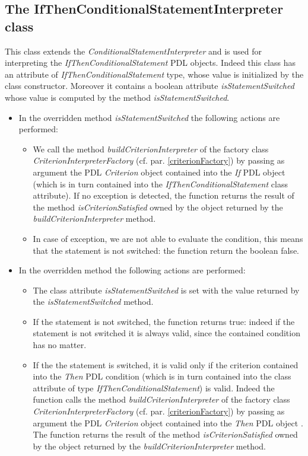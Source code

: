 \documentclass[a4paper,11pt] {ivoa}
\begin{document}
\subsection{The IfThenConditionalStatementInterpreter class}
This class extends the {\it ConditionalStatementInterpreter} and is used for interpreting the {\it IfThenConditionalStatement} PDL objects. Indeed this class has an attribute of {\it IfThenConditionalStatement} type, whose value is initialized by the class constructor. Moreover it contains a boolean attribute {\it isStatementSwitched} whose value is computed by the method {\it isStatementSwitched}.\\
\begin{itemize}
\item In the overridden method {\it isStatementSwitched} the following actions are performed:
\begin{itemize}
\item We call the method {\it buildCriterionInterpreter} of the factory class {\it CriterionInterpreterFactory} (cf. par. \ref{criterionFactory}) by passing as argument the PDL {\it Criterion} object contained into the {\it If} PDL object (which is in turn contained into the {\it IfThenConditionalStatement} class attribute). If no exception is detected, the function returns the result of the method {\it isCriterionSatisfied} owned by the object returned by the {\it buildCriterionInterpreter} method.
\item In case of exception, we are not able to evaluate the condition, this means that the statement is not switched: the function return the boolean false.\\
\end{itemize}
\item In the overridden method the following actions are performed:
\begin{itemize}
\item The class attribute {\it isStatementSwitched} is set with the value returned by the  {\it isStatementSwitched} method.
\item If the statement is not switched, the function returns true: indeed if the statement is not switched it is always valid, since the contained condition has no matter.
\item If the the statement is switched, it is valid only if the criterion contained into the {\it Then} PDL condition (which is in turn contained into the class attribute of type {\it IfThenConditionalStatement}) is valid. Indeed the function calls the method {\it buildCriterionInterpreter} of the factory class {\it CriterionInterpreterFactory} (cf. par. \ref{criterionFactory}) by passing as argument the PDL {\it Criterion} object contained into the {\it Then} PDL object . The function returns the result of the method {\it isCriterionSatisfied} owned by the object returned by the {\it buildCriterionInterpreter} method.
\end{itemize}
\end{itemize}
\end{document}
